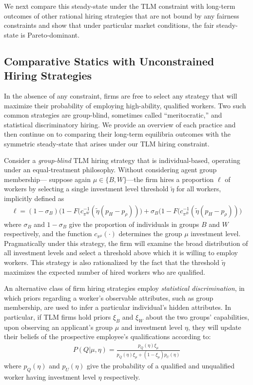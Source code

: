 \documentclass[sigconf]{acmart}
\theoremstyle{definition}
\begin{document}
We next compare this steady-state under the TLM constraint with long-term outcomes of other rational hiring strategies that are not bound by any fairness constraints and show that under particular market conditions, the fair steady-state is Pareto-dominant. 

\subsection{Comparative Statics with Unconstrained Hiring Strategies}
In the absence of any constraint, firms are free to select any strategy that will maximize their probability of employing high-ability, qualified workers. Two such common strategies are group-blind, sometimes called ``meritocratic,'' and statistical discriminatory hiring. We provide an overview of each practice and then continue on to comparing their long-term equilibria outcomes with the symmetric steady-state that arises under our TLM hiring constraint.

Consider a \emph{group-blind} TLM hiring strategy that is individual-based, operating under an equal-treatment philosophy. Without considering agent group membership--- suppose again $\mu \in \{B, W \}$---the firm hires a proportion $\ell$ of workers by selecting a single investment level threshold $\tilde{\eta}$ for all workers, implicitly defined as
\begin{align*}
\ell = (1-\sigma_B)\Big(1-F(c_{\pi^W}^{-1}(\tilde{\eta}(p_H - p_\rho))\Big)+ \sigma_B\Big(1-F(c_{\pi^B}^{-1}(\tilde{\eta}(p_H-p_\rho))\Big)
\end{align*}
where $\sigma_B$ and $1-\sigma_B$ give the proportion of individuals in groups $B$ and $W$ respectively, and the function $c_{\pi^\mu}(\cdot)$ determines the group $\mu$ investment level. Pragmatically under this strategy, the firm will examine the broad distribution of all investment levels and select a threshold above which it is willing to employ workers. This strategy is also rationalized by the fact that the threshold $\tilde{\eta}$ maximizes the expected number of hired workers who are qualified.

An alternative class of firm hiring strategies employ \emph{statistical discrimination}, in which priors regarding a worker's observable attributes, such as group membership, are used to infer a particular individual's hidden attributes. In particular, if TLM firms hold priors $\xi_B$ and $\xi_W$ about the two groups' capabilities, upon observing an applicant's group $\mu$ and investment level $\eta$, they will update their beliefs of the prospective employee's qualifications according to: 
\begin{align*} 
P(Q | \mu, \eta) = \frac{p_Q(\eta) \xi_\mu}{p_Q(\eta) \xi_\mu + (1-\xi_\mu)p_U(\eta)}
\end{align*}
where $p_Q(\eta)$ and $p_U(\eta)$ give the probability of a qualified and unqualified worker having investment level $\eta$ respectively.
\end{document}
